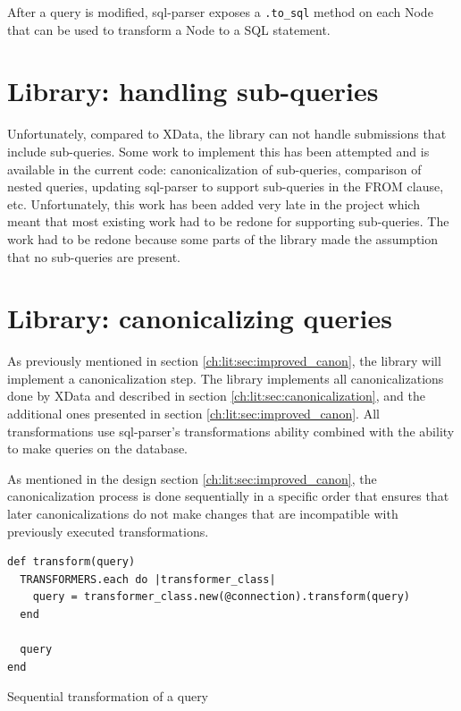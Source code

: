 After a query is modified, sql-parser exposes a \texttt{.to_sql} method on each Node that can be used to transform a Node to a SQL statement.

\section{Library: handling sub-queries}

Unfortunately, compared to XData, the library can not handle submissions that include sub-queries. Some work to implement this has been attempted and is available in the current code: canonicalization of sub-queries, comparison of nested queries, updating sql-parser to support sub-queries in the FROM clause, etc. Unfortunately, this work has been added very late in the project which meant that most existing work had to be redone for supporting sub-queries. The work had to be redone because some parts of the library made the assumption that no sub-queries are present.

\section{Library: canonicalizing queries}

As previously mentioned in section \ref{ch:lit:sec:improved_canon}, the library will implement a canonicalization step. The library implements all canonicalizations done by XData and described in section \ref{ch:lit:sec:canonicalization}, and the additional ones presented in section \ref{ch:lit:sec:improved_canon}. All transformations use sql-parser's transformations ability combined with the ability to make queries on the database.

As mentioned in the design section \ref{ch:lit:sec:improved_canon}, the canonicalization process is done sequentially in a specific order that ensures that later canonicalizations do not make changes that are incompatible with previously executed transformations. 

\begin{code}
\begin{verbatim}
def transform(query)
  TRANSFORMERS.each do |transformer_class|
    query = transformer_class.new(@connection).transform(query)
  end

  query
end
\end{verbatim}
\caption{Sequential transformation of a query}
\label{fig:sequential transformation of a query}
\end{code}

